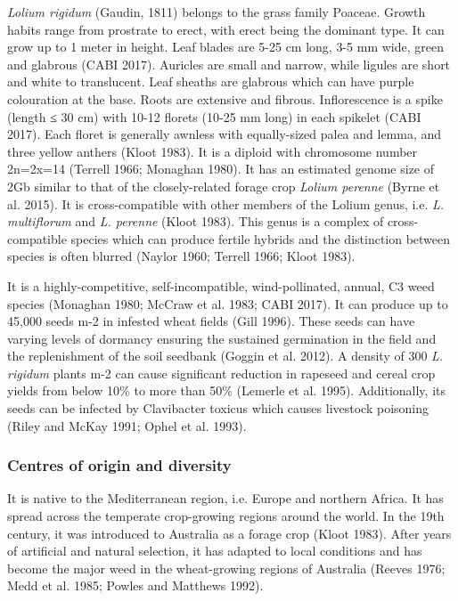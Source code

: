 \emph{Lolium rigidum} (Gaudin, 1811) belongs to the grass family
Poaceae. Growth habits range from prostrate to erect, with erect being
the dominant type. It can grow up to 1 meter in height. Leaf blades are
5-25 cm long, 3-5 mm wide, green and glabrous (CABI 2017). Auricles are
small and narrow, while ligules are short and white to translucent. Leaf
sheaths are glabrous which can have purple colouration at the base.
Roots are extensive and fibrous. Inflorescence is a spike (length ≤ 30
cm) with 10-12 florets (10-25 mm long) in each spikelet (CABI 2017).
Each floret is generally awnless with equally-sized palea and lemma, and
three yellow anthers (Kloot 1983). It is a diploid with chromosome
number 2n=2x=14 (Terrell 1966; Monaghan 1980). It has an estimated
genome size of 2Gb similar to that of the closely-related forage crop
\emph{Lolium perenne} (Byrne et al. 2015). It is cross-compatible with
other members of the Lolium genus, i.e. \emph{L. multiflorum} and
\emph{L. perenne} (Kloot 1983). This genus is a complex of
cross-compatible species which can produce fertile hybrids and the
distinction between species is often blurred (Naylor 1960; Terrell 1966;
Kloot 1983).

It is a highly-competitive, self-incompatible, wind-pollinated, annual,
C3 weed species (Monaghan 1980; McCraw et al. 1983; CABI 2017). It can
produce up to 45,000 seeds m-2 in infested wheat fields (Gill 1996).
These seeds can have varying levels of dormancy ensuring the sustained
germination in the field and the replenishment of the soil seedbank
(Goggin et al. 2012). A density of 300 \emph{L. rigidum} plants m-2 can
cause significant reduction in rapeseed and cereal crop yields from
below 10\% to more than 50\% (Lemerle et al. 1995). Additionally, its
seeds can be infected by Clavibacter toxicus which causes livestock
poisoning (Riley and McKay 1991; Ophel et al. 1993).

\hypertarget{centres-of-origin-and-diversity}{%
\subsubsection{Centres of origin and
diversity}\label{centres-of-origin-and-diversity}}

It is native to the Mediterranean region, i.e. Europe and northern
Africa. It has spread across the temperate crop-growing regions around
the world. In the 19th century, it was introduced to Australia as a
forage crop (Kloot 1983). After years of artificial and natural
selection, it has adapted to local conditions and has become the major
weed in the wheat-growing regions of Australia (Reeves 1976; Medd et al.
1985; Powles and Matthews 1992).

